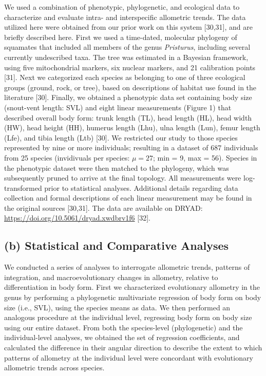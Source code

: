 \documentclass[
  11pt,
]{article}
\begin{document}
We used a combination of phenotypic, phylogenetic, and ecological data
to characterize and evaluate intra- and interspecific allometric trends.
The data utilized here were obtained from our prior work on this system
{[}30,31{]}, and are briefly described here. First we used a time-dated,
molecular phylogeny of squamates that included all members of the genus
\emph{Pristurus}, including several currently undescribed taxa. The tree
was estimated in a Bayesian framework, using five mitochondrial markers,
six nuclear markers, and 21 calibration points {[}31{]}. Next we
categorized each species as belonging to one of three ecological groups
(ground, rock, or tree), based on descriptions of habitat use found in
the literature {[}30{]}. Finally, we obtained a phenotypic data set
containing body size (snout-vent length: SVL) and eight linear
measurements (Figure 1) that described overall body form: trunk length
(TL), head length (HL), head width (HW), head height (HH), humerus
length (Lhu), ulna length (Lun), femur length (Lfe), and tibia length
(Ltb) {[}30{]}. We restricted our study to those species represented by
nine or more individuals; resulting in a dataset of 687 individuals from
25 species (invidivuals per species: \(\mu=27\); min = 9, max = 56).
Species in the phenotypic dataset were then matched to the phylogeny,
which was subsequently pruned to arrive at the final topology. All
measurements were log-transformed prior to statistical analyses.
Additional details regarding data collection and formal descriptions of
each linear measurement may be found in the original sources
{[}30,31{]}. The data are available on DRYAD:
\url{https://doi.org/10.5061/dryad.xwdbrv1f6} {[}32{]}.

\hypertarget{b-statistical-and-comparative-analyses}{%
\subsection{(b) Statistical and Comparative
Analyses}\label{b-statistical-and-comparative-analyses}}

We conducted a series of analyses to interrogate allometric trends,
patterns of integration, and macroevolutionary changes in allometry,
relative to differentiation in body form. First we characterized
evolutionary allometry in the genus by performing a phylogenetic
multivariate regression of body form on body size (i.e., SVL), using the
species means as data. We then performed an analogous procedure at the
individual level, regressing body form on body size using our entire
dataset. From both the species-level (phylogenetic) and the
individual-level analyses, we obtained the set of regression
coefficients, and calculated the difference in their angular direction
to describe the extent to which patterns of allometry at the individual
level were concordant with evolutionary allometric trends across
species. \hfill\break
\end{document}
